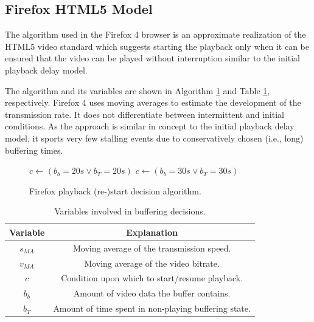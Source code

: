 \subsection{Firefox HTML5 Model}
The algorithm used in the Firefox 4 browser is an approximate realization of the HTML5 video standard \cite{html5} which suggests starting the playback only when it can be ensured that the video can be played without interruption similar to the initial playback delay model.

The algorithm and its variables are shown in Algorithm \ref{alg:firefox-PV} and Table \ref{tbl:buffvars}, respectively. Firefox 4 uses moving averages to estimate the development of the transmission rate. It does not differentiate between intermittent and initial conditions. As the approach is similar in concept to the initial playback delay model, %
it sports very few stalling events due to conservatively chosen (i.e., long) buffering times.



\begin{figure}
\centering
\begin{algorithmic}
  \STATE $c \gets ( b_b=20s \lor b_T=20s )$
\ELSE
  \STATE $c \gets ( b_b=30s \lor b_T=30s )$
\ENDIF 
\end{algorithmic}
\caption{Firefox playback (re-)start decision algorithm.}
\label{alg:firefox-PV}
\end{figure}

\begin{table}

\caption{Variables involved in buffering decisions.}
\label{tbl:buffvars}
\centering
\begin{tabular}{|c|c|} \hline
Variable & Explanation \\ \hline\hline
$s_{MA}$ & Moving average of the transmission speed. \\ \hline
$v_{MA}$ & Moving average of the video bitrate. \\ \hline
$c$   & Condition upon which to start/resume playback. \\ \hline
$b_b$    & Amount of video data the buffer contains. \\ \hline
$b_T$    & Amount of time spent in non-playing buffering state. \\ \hline
\end{tabular}

\end{table}
 
